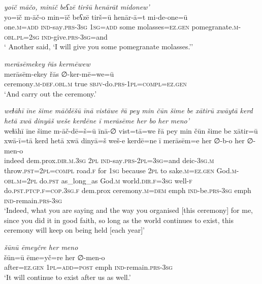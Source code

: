 \ea \label{ZP.120}
\textit{yoīč māčo, minīč beʕzē tiršū henārāt midonew’} \\ 
\gll yo=īč m-āč-o min=īč beʕzē tirš=ū henār-ā=t mi-de-one=ū \\ 
 one\textsc{.m}\textsc{=add} \textsc{ind-}say\textsc{.prs}\textsc{-3sg} \textsc{1sg}\textsc{=add} some molasses\textsc{\textsc{=ez.gen}} pomegranate\textsc{.m}\textsc{-obl}\textsc{.pl}\textsc{=\textsc{2sg}} \textsc{ind-}give\textsc{.prs}\textsc{-3sg}=and \\ 
\glt ` Another said, ‘I will give you some pomegranate molasses.’'
\z 
 
\ea \label{ZP.123}
\textit{merāsēmekey řās kermēwew} \\ 
\gll merāsēm-ekey řās ∅-ker-mē=we=ū \\ 
 ceremony\textsc{.m}\textsc{-def}\textsc{.obl}\textsc{.m} true \textsc{sbjv-}do\textsc{.prs}\textsc{-1pl}\textsc{=compl}\textsc{\textsc{=ez.gen}} \\ 
\glt `And carry out the ceremony.'
\z 
 
\ea \label{ZP.128}
\textit{weɫāhī īne šime māčdēšū īnā vistāwe řā pey min čūn šime be xātirū xwāytā kerd hetā xwā dinyāš weše kerdēne ī merāsēme her bo her meno’} \\ 
\gll weɫāhī īne šime m-āč-dē=š=ū īnā-∅ vist=tā=we řā pey min čūn šime be xātir=ū xwā-ī=tā kerd hetā xwā dinyā=š weš-e kerdē=ne ī merāsēm=e her ∅-b-o her ∅-men-o \\ 
 indeed dem.prox\textsc{.dir}\textsc{.m}\textsc{.3sg} \textsc{2pl} \textsc{ind-}say\textsc{.prs}-\textsc{2pl}\textsc{=3sg}=and deic\textsc{-3sg}\textsc{.m} throw\textsc{.pst}=\textsc{2pl}\textsc{=compl} road\textsc{.f} for \textsc{1sg} because \textsc{2pl} to sake\textsc{.m}\textsc{\textsc{=ez.gen}} God\textsc{.m}\textsc{-obl}\textsc{.m}=\textsc{2pl} do\textsc{.pst} as\_long\_as God\textsc{.m} world\textsc{.dir}\textsc{.f}\textsc{=3sg} well\textsc{-f} do\textsc{.pst}\textsc{.ptcp}\textsc{.f}\textsc{=cop}\textsc{.3sg}\textsc{.f} dem.prox ceremony\textsc{.m}\textsc{=dem} emph \textsc{ind-}be\textsc{.prs}\textsc{-3sg} emph \textsc{ind-}remain\textsc{.prs}\textsc{-3sg} \\ 
\glt `Indeed, what you are saying and the way you organised [this ceremony] for me, since you did it in good faith, so long as the world continues to exist, this ceremony will keep on being held [each year]'
\z 
 
\ea \label{ZP.129}
\textit{šūnū ēmeyčre her meno} \\ 
\gll šūn=ū ēme=yč=re her ∅-men-o \\ 
 after\textsc{\textsc{=ez.gen}} \textsc{1pl}\textsc{=add}\textsc{=\textsc{post}} emph \textsc{ind-}remain\textsc{.prs}\textsc{-3sg} \\ 
\glt `It will continue to exist after us as well.'
\z 
 

